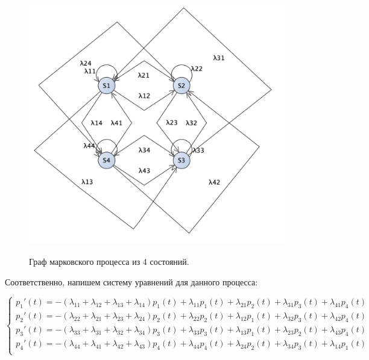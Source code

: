 \documentclass[a4paper,12pt]{article}
\begin{document}
	\begin{figure}[h!]
		\begin{center}
			{\includegraphics[scale = 0.4]{system.png}}
			\label{ris:system}
		\end{center}
		\caption{Граф марковского процесса из 4 состояний.}
	\end{figure}

	Соответственно, напишем систему уравнений для данного процесса:
	
	\begin{equation}
	\begin{cases}
		p_1'(t) = -(\lambda_{11} + \lambda_{12} + \lambda_{13} + \lambda_{14}) p_1(t) + \lambda_{11} p_1(t) + \lambda_{21} p_2(t) + \lambda_{31} p_3(t) + \lambda_{41} p_4(t)\\
		p_2'(t) = -(\lambda_{22} + \lambda_{21} + \lambda_{23} + \lambda_{24}) p_2(t) + \lambda_{22} p_2(t) + \lambda_{12} p_1(t) + \lambda_{32} p_3(t) + \lambda_{42} p_4(t)\\
		p_3'(t) = -(\lambda_{33} + \lambda_{31} + \lambda_{32} + \lambda_{34}) p_3(t) + \lambda_{33} p_3(t) + \lambda_{13} p_1(t) + \lambda_{23} p_2(t) + \lambda_{43} p_4(t)\\
		p_4'(t) = -(\lambda_{44} + \lambda_{41} + \lambda_{42} + \lambda_{43}) p_4(t) + \lambda_{44} p_4(t) + \lambda_{24} p_2(t) + \lambda_{34} p_3(t) + \lambda_{14} p_1(t)\\
	\end{cases}
	\end{equation}
\end{document}
